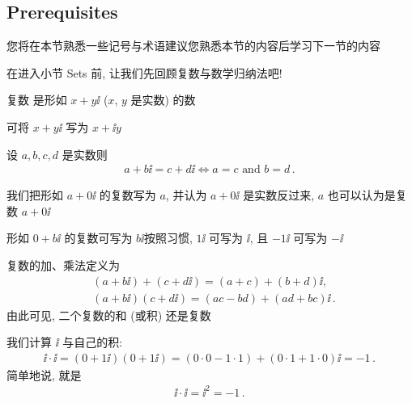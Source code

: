 \subsection*{Prerequisites}

您将在本节熟悉一些记号与术语\period 建议您熟悉本节的内容后学习下一节的内容\period

在进入小节 Sets 前, 让我们先回顾复数与数学归纳法吧!

\begin{definition}
    复数  是形如 $x + y \ii$ ($x$, $y$ 是实数) 的数\period
\end{definition}

\begin{remark}
    可将 $x + y \ii$ 写为 $x + \ii y$\period
\end{remark}

\begin{definition}
    设 $a,b,c,d$ 是实数\period 则
    \begin{align*}
        a + b \ii = c + d \ii \iff a = c \text{ and } b = d \period
    \end{align*}
\end{definition}

\begin{remark}
    我们把形如 $a+0 \ii$ 的复数写为 $a$, 并认为 $a+0 \ii$ 是实数\period 反过来, $a$ 也可以认为是复数 $a + 0 \ii$\period

    形如 $0 + b \ii$ 的复数可写为 $b \ii$\period 按照习惯, $1\ii$ 可写为 $\ii$, 且 $-1\ii$ 可写为 $-\ii$\period
\end{remark}

\begin{definition}
    复数的加、乘法定义为
    \begin{align*}
         & (a + b \ii) + (c + d \ii) = (a + c) + (b + d) \ii,          \\
         & (a + b \ii) (c + d \ii) = (ac - bd) + (ad + bc) \ii \period
    \end{align*}
    由此可见, 二个复数的和 (或积) 还是复数\period
\end{definition}

\begin{example}
    我们计算 $\ii$ 与自己的积:
    \begin{align*}
        \ii \cdot \ii = (0 + 1\ii) (0 + 1\ii) = (0 \cdot 0 - 1 \cdot 1) + (0 \cdot 1 + 1 \cdot 0) \ii = -1 \period
    \end{align*}
    简单地说, 就是
    \begin{align*}
        \ii \cdot \ii = \ii^2 = -1 \period
    \end{align*}
\end{example}


